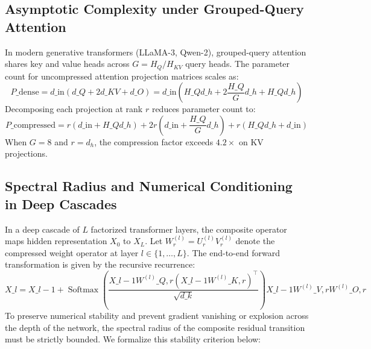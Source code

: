 \subsection*{Asymptotic Complexity under Grouped-Query Attention}
In modern generative transformers (LLaMA-3, Qwen-2), grouped-query attention shares key and value heads across $G = H_Q / H_{KV}$ query heads. The parameter count for uncompressed attention projection matrices scales as:
\[
P\_{\text{dense}} = d\_{\text{in}} \left( d\_Q + 2 d\_{KV} + d\_O \right) = d\_{\text{in}} \left( H\_Q d\_h + 2 \frac{H\_Q}{G} d\_h + H\_Q d\_h \right)
\]
Decomposing each projection at rank $r$ reduces parameter count to:
\[
P\_{\text{compressed}} = r \left( d\_{\text{in}} + H\_Q d\_h \right) + 2 r \left( d\_{\text{in}} + \frac{H\_Q}{G} d\_h \right) + r \left( H\_Q d\_h + d\_{\text{in}} \right)
\]
When $G = 8$ and $r = d_h$, the compression factor exceeds $4.2\times$ on KV projections.

\subsection*{Spectral Radius and Numerical Conditioning in Deep Cascades}
In a deep cascade of $L$ factorized transformer layers, the composite operator maps hidden representation $X_0$ to $X_L$. Let $W^{(l)}_r = U^{(l)}_r V^{(l)}_r$ denote the compressed weight operator at layer $l \in \{1, \dots, L\}$. The end-to-end forward transformation is given by the recursive recurrence:
\[
X\_l = X\_{l-1} + \operatorname{Softmax}\left( \frac{X\_{l-1} W^{(l)}\_{Q, r} (X\_{l-1} W^{(l)}\_{K, r})^\top}{\sqrt{d\_k}} \right) X\_{l-1} W^{(l)}\_{V, r} W^{(l)}\_{O, r}
\]
To preserve numerical stability and prevent gradient vanishing or explosion across the depth of the network, the spectral radius of the composite residual transition must be strictly bounded. We formalize this stability criterion below:

